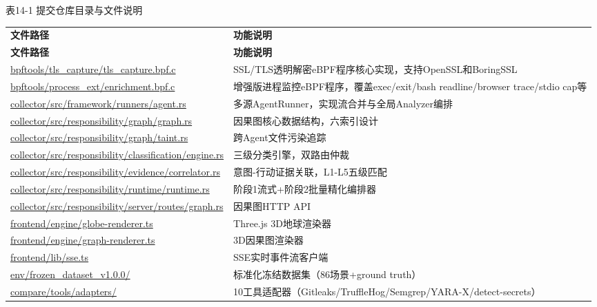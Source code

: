 \documentclass[a4paper]{ctexart}
\makeatletter
\renewcommand{\_}{%
  \ifmmode
    \nfss@text{\textunderscore}%
  \else
    \textunderscore\discretionary{}{}{}%
  \fi}
\makeatother
\begin{document}
\medskip
{\centering\small
表14-1 提交仓库目录与文件说明\par
\vspace{3pt}
\setlength{\tabcolsep}{6pt}
\renewcommand{\arraystretch}{1.1}
\begin{longtable}{>{\raggedright\arraybackslash}p{7.1cm} >{\raggedright\arraybackslash}p{7.1cm}}
\hline
\textbf{文件路径} & \textbf{功能说明} \\*
\hline
\endfirsthead
\hline
\textbf{文件路径} & \textbf{功能说明} \\
\hline
\endhead
\hline
\endfoot
\hline
\endlastfoot
\url{bpftools/tls_capture/tls_capture.bpf.c} & SSL/TLS透明解密eBPF程序核心实现，支持OpenSSL和BoringSSL \\*
\hline
\url{bpftools/process_ext/enrichment.bpf.c} & 增强版进程监控eBPF程序，覆盖exec/exit/bash readline/browser trace/stdio cap等 \\
\hline
\url{collector/src/framework/runners/agent.rs} & 多源AgentRunner，实现流合并与全局Analyzer编排 \\
\hline
\url{collector/src/responsibility/graph/graph.rs} & 因果图核心数据结构，六索引设计 \\
\hline
\url{collector/src/responsibility/graph/taint.rs} & 跨Agent文件污染追踪 \\
\hline
\url{collector/src/responsibility/classification/engine.rs} & 三级分类引擎，双路由仲裁 \\
\hline
\url{collector/src/responsibility/evidence/correlator.rs} & 意图-行动证据关联，L1-L5五级匹配 \\
\hline
\url{collector/src/responsibility/runtime/runtime.rs} & 阶段1流式+阶段2批量精化编排器 \\
\hline
\url{collector/src/responsibility/server/routes/graph.rs} & 因果图HTTP API \\
\hline
\url{frontend/engine/globe-renderer.ts} & Three.js 3D地球渲染器 \\
\hline
\url{frontend/engine/graph-renderer.ts} & 3D因果图渲染器 \\
\hline
\url{frontend/lib/sse.ts} & SSE实时事件流客户端 \\
\hline
\url{env/frozen_dataset_v1.0.0/} & 标准化冻结数据集（86场景+ground truth） \\
\hline
\url{compare/tools/adapters/} & 10工具适配器（Gitleaks/\allowbreak TruffleHog/\allowbreak Semgrep/\allowbreak YARA-X/\allowbreak detect-secrets） \\
\hline
\end{longtable}
\par}
\end{document}

